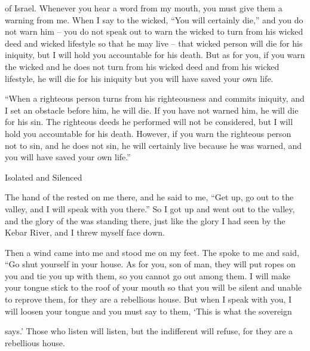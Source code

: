 {of Israel.
Whenever you hear
a word
from my mouth,
you must
give them
a warning
from me.
When I say
to the wicked,
“You will certainly
die,”
and you do not
warn him – you do not speak out to warn the wicked to turn from his wicked deed and wicked lifestyle so that he may live – that wicked person will die for his iniquity, but I will hold you accountable for his death.
But as for
you,
if
you warn
the wicked
and he does not
turn
from his wicked
deed and from his wicked
lifestyle,
he
will die
for his iniquity
but you
will have saved
your own life.
\par }{\PP {}“When
a righteous
person turns
from his righteousness
and commits
iniquity,
and I set
an obstacle
before
him, he
will die.
If
you have not
warned
him, he will die
for his sin.
The righteous
deeds he performed
will not
be considered, but I will hold
you accountable for his death.
However, if you
warn
the righteous
person not
to sin,
and he
does not
sin,
he will certainly
live
because
he was warned,
and you
will have saved
your own life.”
\par }{\SH Isolated and Silenced
\par }{\PP {}The hand
of the {}
rested on
me there,
and he said
to me,
“Get
up, go out
to
the valley,
and I will speak
with
you there.”
So I got
up and went out
to
the valley,
and the glory
of the {}
was standing
there, just like the glory
I had
seen
by the Kebar
River,
and I threw
myself face
down.
\par }{\PP {}Then a wind
came
into me and stood
me on
my feet.
The
{} spoke
to
me and said,
“Go
shut
yourself in
your house.
As for you,
son
of man,
they will put
ropes
on
you and tie
you up
with them, so you cannot
go out
among them.
I will make your tongue
stick
to
the roof of your mouth
so that you will be
silent
and unable
to reprove
them, for
they
are a rebellious
house.
But when I speak
with
you, I will loosen
your tongue
and you must say
to
them, ‘This is what
the sovereign

{}
says.’ Those who listen
will listen,
but the indifferent
will refuse, for
they are
a rebellious
house.

}

